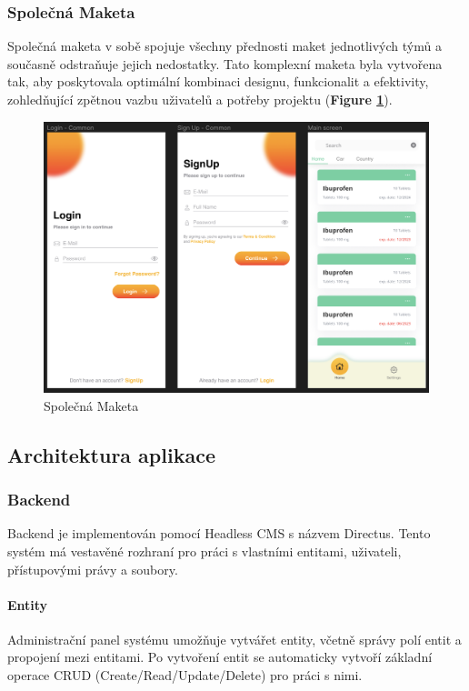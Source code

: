 \documentclass[a4paper, 11pt]{article}
\begin{document}
\FloatBarrier

   \subsubsection{Společná Maketa}
    Společná maketa v sobě spojuje všechny přednosti maket jednotlivých týmů a současně odstraňuje jejich nedostatky. Tato komplexní maketa byla vytvořena tak, aby poskytovala optimální kombinaci designu, funkcionalit a efektivity, zohledňující zpětnou vazbu uživatelů a potřeby projektu (\textbf {Figure \ref{figure:spolecnamaketa}}).
   \begin{figure}[!ht]
		\centering	\includegraphics[width=\textwidth,height=\textheight,keepaspectratio]{Common_Maket.png}
		\caption{Společná Maketa}
		\label{figure:spolecnamaketa}
	\end{figure}

\FloatBarrier

\subsection{Architektura aplikace}
\subsubsection{Backend}
 Backend je implementován pomocí Headless CMS s názvem Directus. Tento systém má vestavěné rozhraní pro práci s vlastními entitami, uživateli, přístupovými právy a soubory.

\paragraph{Entity}
Administrační panel systému umožňuje vytvářet entity, včetně správy polí entit a propojení mezi entitami. Po vytvoření entit se automaticky vytvoří základní operace CRUD (Create/Read/Update/Delete) pro práci s nimi.
\end{document}

